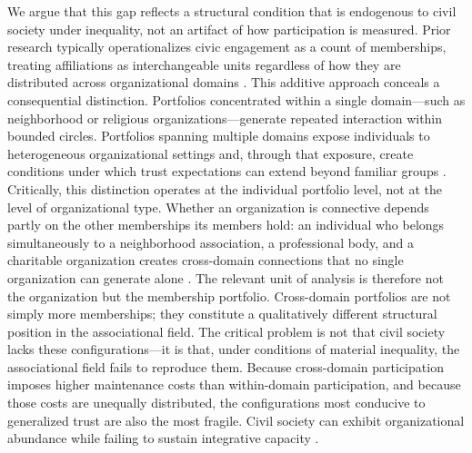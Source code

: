 We argue that this gap reflects a structural condition that is endogenous to civil society under inequality, not an artifact of how participation is measured. Prior research typically operationalizes civic engagement as a count of memberships, treating affiliations as interchangeable units regardless of how they are distributed across organizational domains \parencite{coleman_social_1988, putnam_bowling_2000}. This additive approach conceals a consequential distinction. Portfolios concentrated within a single domain---such as neighborhood or religious organizations---generate repeated interaction within bounded circles. Portfolios spanning multiple domains expose individuals to heterogeneous organizational settings and, through that exposure, create conditions under which trust expectations can extend beyond familiar groups \parencite{simmel_conflict_1922, breiger_duality_1974}. Critically, this distinction operates at the individual portfolio level, not at the level of organizational type. Whether an organization is connective depends partly on the other memberships its members hold: an individual who belongs simultaneously to a neighborhood association, a professional body, and a charitable organization creates cross-domain connections that no single organization can generate alone \parencite{breiger_duality_1974, mcpherson_hypernetwork_1982}. The relevant unit of analysis is therefore not the organization but the membership portfolio. Cross-domain portfolios are not simply more memberships; they constitute a qualitatively different structural position in the associational field. The critical problem is not that civil society lacks these configurations---it is that, under conditions of material inequality, the associational field fails to reproduce them. Because cross-domain participation imposes higher maintenance costs than within-domain participation, and because those costs are unequally distributed, the configurations most conducive to generalized trust are also the most fragile. Civil society can exhibit organizational abundance while failing to sustain integrative capacity \parencite{portes_social_1998, oxhorn_neopluralism_2004}.

